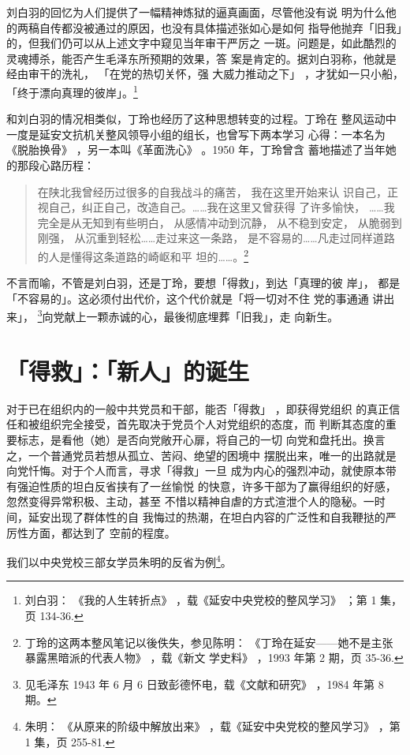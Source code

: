 刘白羽的回忆为人们提供了一幅精神炼狱的逼真画面，尽管他没有说
明为什么他的两稿自传都没被通过的原因，也没有具体描述张如心是如何
指导他抛弃「旧我」的，但我们仍可以从上述文字中窥见当年审干严厉之
一斑。问题是，如此酷烈的灵魂搏杀，能否产生毛泽东所预期的效果，答
案是肯定的。据刘白羽称，他就是经由审干的洗礼，
「在党的热切关怀，强
大威力推动之下」
，才犹如一只小船，
「终于漂向真理的彼岸」。\footnote{刘白羽：
《我的人生转折点》
，载《延安中央党校的整风学习》
；第 1 集，页 134-36.} 

和刘白羽的情况相类似，丁玲也经历了这种思想转变的过程。丁玲在
整风运动中一度是延安文抗机关整风领导小组的组长，也曾写下两本学习
心得：一本名为《脱胎换骨》
，另一本叫《革面洗心》
。1950 年，丁玲曾含
蓄地描述了当年她的那段心路历程：
\begin{quote}
{\fzwkai 在陕北我曾经历过很多的自我战斗的痛苦，
我在这里开始来认
识自己，正视自己，纠正自己，改造自己。……我在这里又曾获得
了许多愉快，
……我完全是从无知到有些明白，
从感情冲动到沉静，
从不稳到安定，
从脆弱到刚强，
从沉重到轻松……走过来这一条路，
是不容易的……凡走过同样道路的人是懂得这条道路的崎岖和平
坦的……。\footnote{丁玲的这两本整风笔记以後佚失，参见陈明：
《丁玲在延安——她不是主张暴露黑暗派的代表人物》
，载《新文
学史料》
，1993 年第 2 期，页 35-36.}} 
\end{quote}

不言而喻，不管是刘白羽，还是丁玲，要想「得救」，到达「真理的彼 岸」，
都是「不容易的」。这必须付出代价，这个代价就是「将一切对不住 党的事通通
讲出来」， \footnote{见毛泽东 1943 年 6 月 6 日致彭德怀电，载《文献和研究》
，1984 年第 8 期。}向党献上一颗赤诚的心，最後彻底埋葬「旧我」，走 向新生。

\section{「得救」：「新人」的诞生} 
 
对于已在组织内的一般中共党员和干部，能否「得救」
，即获得党组织
的真正信任和被组织完全接受，首先取决于党员个人对党组织的态度，而
判断其态度的重要标志，是看他（她）是否向党敞开心扉，将自己的一切
向党和盘托出。换言之，一个普通党员若想从孤立、苦闷、绝望的困境中
摆脱出来，唯一的出路就是向党忏悔。对于个人而言，寻求「得救」一旦
成为内心的强烈冲动，就使原本带有强迫性质的坦白反省挟有了一丝愉悦
的快意，许多干部为了赢得组织的好感，忽然变得异常积极、主动，甚至
不惜以精神自虐的方式渲泄个人的隐秘。一时间，延安出现了群体性的自
我悔过的热潮，在坦白内容的广泛性和自我鞭挞的严厉性方面，都达到了
空前的程度。

我们以中央党校三部女学员朱明的反省为例\footnote{ 朱明：
《从原来的阶级中解放出来》
，载《延安中央党校的整风学习》
，第 1 集，页 255-81.}。

